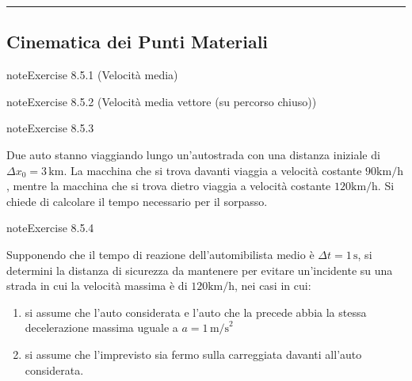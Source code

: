 \documentclass[letterpaper,10pt,italian]{jupyterBook}
\begin{document}
\bigskip\hrule\bigskip



\subsection{Cinematica dei Punti Materiali}
\label{\detokenize{ch/mechanics/kinematics-problems:cinematica-dei-punti-materiali}} \label{exercise:ch/mechanics/kinematics-problems-exercise-0}

\begin{sphinxadmonition}{note}{Exercise 8.5.1 (Velocità media)}



\sphinxAtStartPar
{}
\end{sphinxadmonition}
 \label{exercise:ch/mechanics/kinematics-problems-exercise-1}

\begin{sphinxadmonition}{note}{Exercise 8.5.2 (Velocità media vettore (su percorso chiuso))}



\sphinxAtStartPar
{}
\end{sphinxadmonition}
 \label{exercise:ch/mechanics/kinematics-problems-exercise-2}

\begin{sphinxadmonition}{note}{Exercise 8.5.3}



\sphinxAtStartPar
Due auto stanno viaggiando lungo un’autostrada con una distanza iniziale di \(\Delta x_0 = 3 \, \text{km}\). La macchina che si trova davanti viaggia a velocità costante \(90 \text{km/h}\), mentre la macchina che si trova dietro viaggia a velocità costante \(120 \text{km/h}\). Si chiede di calcolare il tempo necessario per il sorpasso.
\end{sphinxadmonition}
 \label{exercise:ch/mechanics/kinematics-problems-exercise-3}

\begin{sphinxadmonition}{note}{Exercise 8.5.4}



\sphinxAtStartPar
Supponendo che il tempo di reazione dell’automibilista medio è \(\Delta t = 1 \, \text{s}\), si determini la distanza di sicurezza da mantenere per evitare un’incidente su una strada in cui la velocità massima è di \(120 \text{km/h}\), nei casi in cui:
\begin{enumerate}
%
\item {} 
\sphinxAtStartPar
si assume che l’auto considerata e l’auto che la precede abbia la stessa decelerazione massima uguale a \(a = 1 \, \text{m/s}^2\)

\item {} 
\sphinxAtStartPar
si assume che l’imprevisto sia fermo sulla carreggiata davanti all’auto considerata.

\end{enumerate}
\end{sphinxadmonition}
 \label{exercise:ch/mechanics/kinematics-problems-exercise-4}
\end{document}
